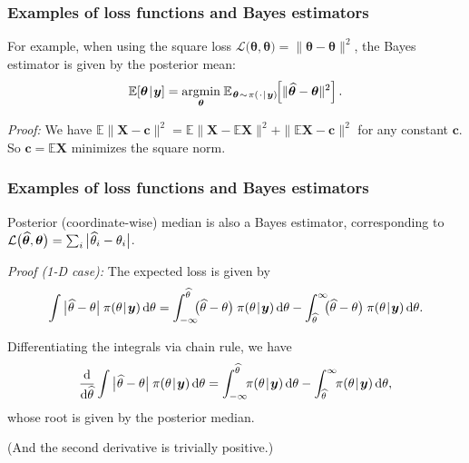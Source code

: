 \documentclass[18pt]{beamer}
\newcommand{\defineTightSpacing}{%
	\setlength{\abovedisplayskip}{.25\baselineskip}%
	\setlength{\belowdisplayskip}{.25\baselineskip}%
}
\renewcommand{\textsc}[1]{{\small \MakeUppercase{#1}}}
\newcommand{\given}{\thinnerspace | \thinnerspace}
\newcommand{\diff}{\operatorname{\mathrm{d}}\!{}}
\DeclareMathOperator*{\argmin}{argmin}
\newcommand{\thinnerspace}{\mskip.5\thinmuskip}
\newcommand{\thinnestspace}{\mskip.25\thinmuskip}
\newcommand{\expectation}{\mathbb{E}}
\newcommand{\density}{\operatorname{\pi}}
\newcommand{\by}{\bm{y}}
\newcommand{\btheta}{\bm{\theta}}
\newcommand{\loss}{\mathcal{L}}
\begin{document}
\begin{frame}
\frametitle{Examples of loss functions and Bayes estimators}
\smallskip
For example, when using the square loss $\loss\big(\widehat{\btheta}, \btheta \big) = \| \widehat{\btheta} - \btheta\|^2$, the Bayes estimator is given by the posterior mean:
\begin{equation*} \defineTightSpacing%
\expectation\!\left[ \btheta \given \by \right] =
	\argmin_{\btheta} \thinnerspace \expectation_{\thinnerspace \btheta \thinnerspace \sim \thinnerspace \density(\thinnerspace \cdot \given \by)\!}\!\left[
		 \| \widehat{\btheta} - \btheta\|^2
	\right].
\end{equation*}

\pause
\textit{Proof:} We have $\expectation \| \mathbf{X} - \mathbf{c} \|^2 = \expectation \| \mathbf{X} - \expectation \mathbf{X} \|^2 + \| \expectation \mathbf{X} - \mathbf{c} \|^2$ for any constant $\mathbf{c}$. 
So $\mathbf{c} = \expectation \mathbf{X}$ minimizes the square norm. \hfill \qedsymbol
\end{frame}


\begin{frame}
\frametitle{Examples of loss functions and Bayes estimators}
Posterior (coordinate-wise) median is also a Bayes estimator, corresponding to $\loss\big(\widehat{\btheta}, \btheta \big) = \sum_i \big| \thinnestspace \widehat{\theta}_i - \theta_i \big|$.

\pause
\smallskip
\textit{Proof (1-\textsc{D} case):} 
The expected loss is given by
\begin{equation*} \defineTightSpacing%
\int \big| \thinnestspace \widehat{\theta} - \theta \big| \thinnerspace \density(\theta \given \by) \diff \theta
	= \int_{-\infty}^{\widehat{\theta}} \!\!\! \big( \widehat{\theta} - \theta \big) \thinnerspace \density(\theta \given \by) \diff \theta
		- \int_{\widehat{\theta}}^\infty \!\!\! \big( \widehat{\theta} - \theta \big) \thinnerspace \density(\theta \given \by) \diff \theta.
\end{equation*}

\pause
Differentiating the integrals via chain rule, we have
\begin{equation*} \defineTightSpacing%
\frac{\diff}{\diff \widehat{\theta}} \int \big| \thinnestspace \widehat{\theta} - \theta \big| \thinnerspace \density(\theta \given \by) \diff \theta
	= \int_{-\infty}^{\widehat{\theta}} \!\! \density(\theta \given \by) \diff \theta
		- \int_{\widehat{\theta}}^\infty \!\! \density(\theta \given \by) \diff \theta,
\end{equation*}
whose root is given by the posterior median.

\pause
(And the second derivative is trivially positive.) \hfill \qedsymbol
\end{frame}
\end{document}
